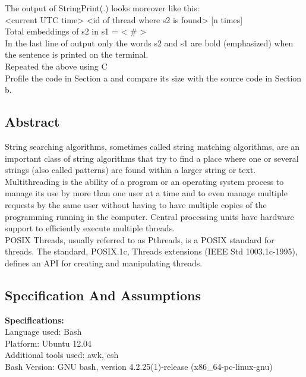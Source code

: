 \documentclass[paper=a4, fontsize=11pt]{scrartcl} %
\numberwithin{equation}{section} %
\numberwithin{figure}{section} %
\numberwithin{table}{section} %
\begin{document}
The output of StringPrint(.) looks moreover like this:\\
<current UTC time> <id of thread where s2 is found> [n times]\\
Total embeddings of s2 in s1 = < \# >\\

In the last line of output only the words s2 and s1 are bold (emphasized) when the sentence is printed on the terminal.\\

Repeated the above using C\\

Profile the code in Section a and compare its size with the source code in Section b.\\

\subsection{Abstract}

String searching algorithms, sometimes called string matching algorithms, are an important class of string algorithms that try to find a place where one or several strings (also called patterns) are found within a larger string or text.\\

Multithreading is the ability of a program or an operating system process to manage its use by more than one user at a time and to even manage multiple requests by the same user without having to have multiple copies of the programming running in the computer. Central processing units have hardware support to efficiently execute multiple threads.\\

POSIX Threads, usually referred to as Pthreads, is a POSIX standard for threads. The standard, POSIX.1c, Threads extensions (IEEE Std 1003.1c-1995), defines an API for creating and manipulating threads.\\

\subsection{Specification And Assumptions}
{\textbf {Specifications:}}\\
Language used: Bash\\
Platform: Ubuntu 12.04\\
Additional tools used: awk, csh\\
Bash Version: GNU bash, version 4.2.25(1)-release (x86\_64-pc-linux-gnu)\\
\end{document}
